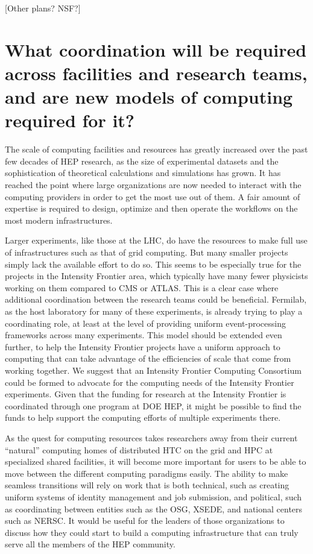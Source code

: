 [Other plans? NSF?]

\section{What coordination will be required across facilities and research teams, and are new models of computing required for it?}


The scale of computing facilities and resources has greatly increased over the past few decades of HEP research, as the size of experimental datasets and the sophistication of theoretical calculations and simulations has grown.  It has reached the point where large organizations are now needed to interact with the computing providers in order to get the most use out of them.  A fair amount of expertise is required to design, optimize and then operate the workflows on the most modern infrastructures.

Larger experiments, like those at the LHC, do have the resources to make full use of infrastructures such as that of grid computing.  But many smaller projects simply lack the available effort to do so.  This seems to be especially true for the projects in the Intensity Frontier area, which typically have many fewer physicists working on them compared to CMS or ATLAS.  This is a clear case where additional coordination between the research teams could be beneficial.  Fermilab, as the host laboratory for many of these experiments, is already trying to play a coordinating role, at least at the level of providing uniform event-processing frameworks across many experiments.  This model should be extended even further, to help the Intensity Frontier projects have a uniform approach to computing that can take advantage of the efficiencies of scale that come from working together.  We suggest that an Intensity Frontier Computing Consortium could be formed to advocate for the computing needs of the Intensity Frontier experiments.  Given that the funding for research at the Intensity Frontier is coordinated through one program at DOE HEP, it might be possible to find the funds to help support the computing efforts of multiple experiments there.

As the quest for computing resources takes researchers away from their current ``natural'' computing homes of distributed HTC on the grid and HPC at specialized shared facilities, it will become more important for users to be able to move between the different computing paradigms easily.  The ability to make seamless transitions will rely on work that is both technical, such as creating uniform systems of identity management and job submission, and political, such as coordinating between entities such as the OSG, XSEDE, and national centers such as NERSC.  It would be useful for the leaders of those organizations to discuss how they could start to build a computing infrastructure that can truly serve all the members of the HEP community.


